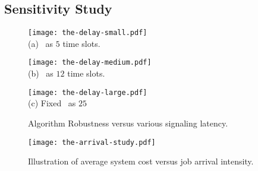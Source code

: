 \subsection{Sensitivity Study}
\label{subsec:advance}
\begin{figure*}[ht!]                                                                %
    \centering                                                                      %
    \begin{minipage}[b]{0.30\textwidth}                                             %
        \texttt{[image: the-delay-small.pdf]} \\              %
        {(a) \brlatency~as $5$ time slots.}                                              %
        \\ %
    \end{minipage}                                                                  %
    \begin{minipage}[b]{0.30\textwidth}                                             %
        \texttt{[image: the-delay-medium.pdf]} \\             %
        {(b) \brlatency~as $12$ time slots.}           %
    \end{minipage}                                                                  %
    \begin{minipage}[b]{0.30\textwidth}                                             %
        \texttt{[image: the-delay-large.pdf]} \\               %
        {(c) Fixed \brlatency~as $25$}             %
    \end{minipage}                                                                  %
    \caption{Algorithm Robustness versus various signaling latency.}                %
    \label{fig:ss_signal}                                                           %
\end{figure*}                                                                       %


\begin{figure}[hbt]                                                 %
    \centering                                                      %
    \texttt{[image: the-arrival-study.pdf]}   %
    \caption{Illustration of average system cost versus job arrival intensity.}
    \label{fig:ss_scale}                                            %
\end{figure}                                                        %

